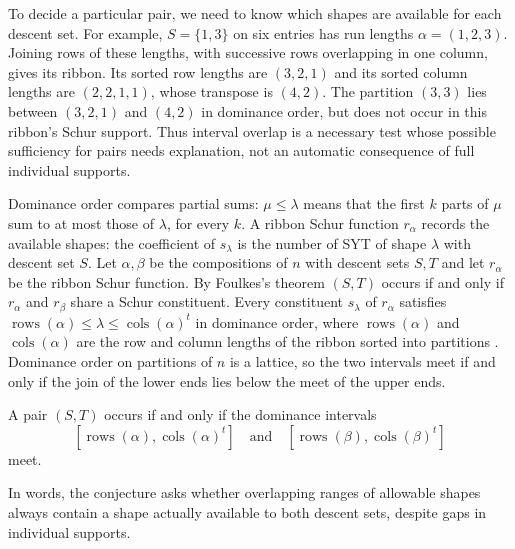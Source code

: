 \documentclass[12pt]{article}
\numberwithin{theorem}{section}
\numberwithin{equation}{section}
\DeclareMathOperator{\rows}{rows}
\DeclareMathOperator{\cols}{cols}
\begin{document}
To decide a particular pair, we need to know which shapes are available for each descent set.
For example, $S=\{1,3\}$ on six entries has run lengths $\alpha=(1,2,3)$.
Joining rows of these lengths, with successive rows overlapping in one column, gives its ribbon.
Its sorted row lengths are $(3,2,1)$ and its sorted column lengths are $(2,2,1,1)$,
whose transpose is $(4,2)$. The partition $(3,3)$ lies between $(3,2,1)$ and $(4,2)$ in dominance order,
but does not occur in this ribbon's Schur support. Thus interval overlap is a necessary test whose possible
sufficiency for pairs needs explanation, not an automatic consequence of full individual supports.

Dominance order compares partial sums: $\mu\le\lambda$ means that the first $k$ parts of $\mu$ sum to
at most those of $\lambda$, for every $k$. A ribbon Schur function $r_\alpha$ records the available shapes:
the coefficient of $s_\lambda$ is the number of SYT of shape $\lambda$ with descent set $S$.
Let $\alpha,\beta$ be the compositions of $n$ with descent sets $S,T$ and let $r_\alpha$ be the ribbon Schur
function. By Foulkes's theorem $(S,T)$ occurs if and only if $r_\alpha$ and $r_\beta$ share a Schur
constituent. Every constituent $s_\lambda$ of $r_\alpha$ satisfies $\rows(\alpha)\le\lambda\le\cols(\alpha)^t$
in dominance order, where $\rows(\alpha)$ and $\cols(\alpha)$ are the row and column lengths of the ribbon
sorted into partitions \cite{mvw2012}. Dominance order on partitions of $n$ is a lattice, so the two intervals
meet if and only if the join of the lower ends lies below the meet of the upper ends.

\begin{conjecture}\label{conj:criterion}
A pair $(S,T)$ occurs if and only if the dominance intervals
\[
[\rows(\alpha),\cols(\alpha)^t]\quad\text{and}\quad[\rows(\beta),\cols(\beta)^t]
\]
meet.
\end{conjecture}

In words, the conjecture asks whether overlapping ranges of allowable shapes always contain a shape actually available to both descent sets, despite gaps in individual supports.
\end{document}
